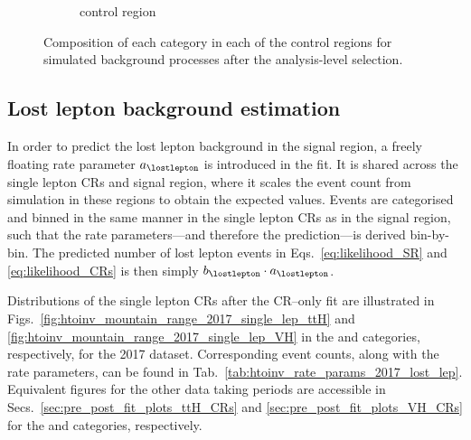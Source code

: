\begin{figure}[htbp]
\begin{subfigure}[b]{0.32\textwidth}
        \caption{\singlePhotonCr control region}
    \end{subfigure}
    \caption[Composition of each category in each of the control regions for simulated background processes after the analysis-level selection]{Composition of each category in each of the control regions for simulated background processes after the analysis-level selection.}
    \label{fig:htoinv_cr_composition_comb2016to18}
\end{figure}




\subsection{Lost lepton background estimation}
\label{subsubsec:htoinv_lost_lepton_bkg}

In order to predict the lost lepton background in the signal region, a freely floating rate parameter $a_{\lostlepton}$ is introduced in the fit. It is shared across the single lepton \glspl{CR} and signal region, where it scales the event count from simulation in these regions to obtain the expected values. Events are categorised and binned in the same manner in the single lepton \glspl{CR} as in the signal region, such that the rate parameters---and therefore the prediction---is derived bin-by-bin. The predicted number of lost lepton events in Eqs.~\ref{eq:likelihood_SR} and \ref{eq:likelihood_CRs} is then simply $b_{\lostlepton} \cdot a_{\lostlepton}$.

Distributions of the single lepton \glspl{CR} after the \gls{CR}--only fit are illustrated in Figs.~\ref{fig:htoinv_mountain_range_2017_single_lep_ttH} and \ref{fig:htoinv_mountain_range_2017_single_lep_VH} in the \ttH and \VH categories, respectively, for the 2017 dataset. Corresponding event counts, along with the rate parameters, can be found in Tab.~\ref{tab:htoinv_rate_params_2017_lost_lep}. Equivalent figures for the other data taking periods are accessible in Secs.~\ref{sec:pre_post_fit_plots_ttH_CRs} and \ref{sec:pre_post_fit_plots_VH_CRs} for the \ttH and \VH categories, respectively.


